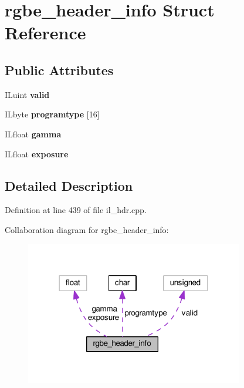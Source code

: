 \hypertarget{structrgbe__header__info}{}\section{rgbe\+\_\+header\+\_\+info Struct Reference}
\label{structrgbe__header__info}
\subsection*{Public Attributes}
\begin{DoxyCompactItemize}
\item 
\mbox{\label{structrgbe__header__info_afa08c4a340d2467715ee984ab50656b1}} 
I\+Luint {\bfseries valid}
\item 
\mbox{\label{structrgbe__header__info_ac3362714fc590eae3768e79414a5971b}} 
I\+Lbyte {\bfseries programtype} \mbox{[}16\mbox{]}
\item 
\mbox{\label{structrgbe__header__info_a6aff82bc129c37a45a27a67e44973e0c}} 
I\+Lfloat {\bfseries gamma}
\item 
\mbox{\label{structrgbe__header__info_ae52cfb262da6f582e001dc1eb3078e3b}} 
I\+Lfloat {\bfseries exposure}
\end{DoxyCompactItemize}


\subsection{Detailed Description}


Definition at line 439 of file il\+\_\+hdr.\+cpp.



Collaboration diagram for rgbe\+\_\+header\+\_\+info\+:
\nopagebreak
\begin{figure}[H]
\begin{center}
\leavevmode
\includegraphics[width=270pt]{db/dd7/structrgbe__header__info__coll__graph}
\end{center}
\end{figure}


